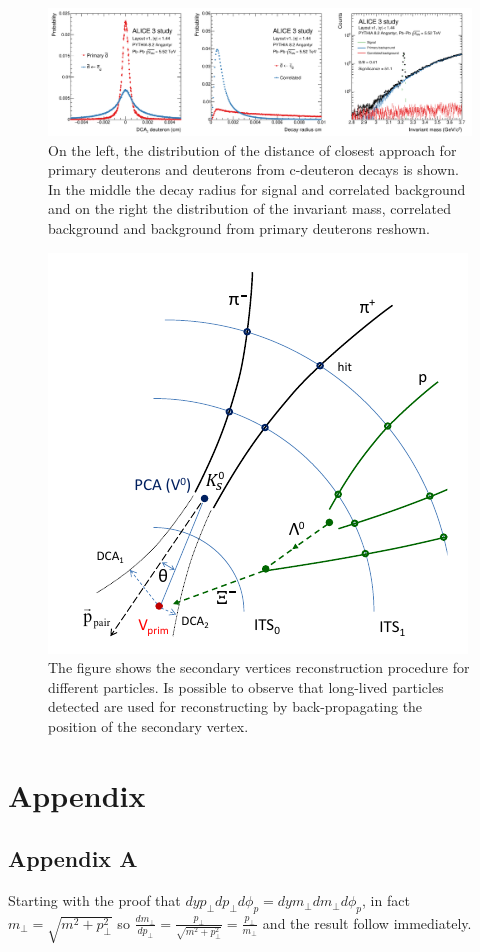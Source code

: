\documentclass[12pt,a4paper]{book}
\begin{document}
	\begin{figure}
	\centering
	\includegraphics[width=1 \linewidth]{pictures/ALICE_c-d_detection.png}
	\caption{On the left, the distribution of the distance of closest approach for primary deuterons and deuterons from c-deuteron decays is shown. In the middle the decay radius for signal and correlated background and on the right the distribution of the invariant mass, correlated background and background from primary deuterons reshown.}
	\label{fig:ALICE_c-d_detection}
\end{figure}

	\begin{figure}
	\centering
		\includegraphics[width=0.5 \linewidth]{pictures/secondary_vertex.png}
		\caption{The figure shows the secondary vertices reconstruction procedure for different particles. Is possible to observe that long-lived particles detected are used for reconstructing by back-propagating the position of the secondary vertex.}
		\label{fig:secondary_vertex}
\end{figure}


	
	\chapter{Appendix}
	\appendix
	\renewcommand{\thesection}{\Alph{section}}
	\section{Appendix A} \label{app:A}
	Starting with the proof that $dy p_\perp dp_\perp d\phi_p = dy m_\perp dm_\perp d\phi_p$, in fact $m_\perp=\sqrt{m^2 + p_\perp^2}$ so $\frac{dm_\perp}{dp_\perp}= \frac{p_\perp}{\sqrt{m^2 + p_\perp^2}} = \frac{p_\perp}{m_\perp}$ and the result follow immediately.
	
\end{document}

